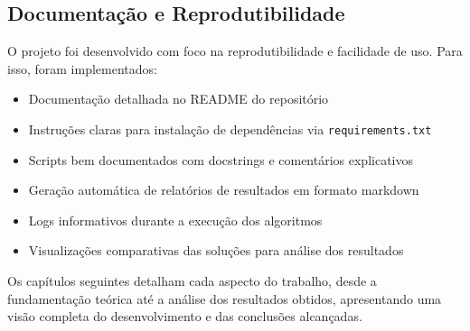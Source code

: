 \documentclass[12pt, a4paper]{report}
\begin{document}
\subsection{Documentação e Reprodutibilidade}
O projeto foi desenvolvido com foco na reprodutibilidade e facilidade de uso. Para isso, foram implementados:

\begin{itemize}
    \item Documentação detalhada no README do repositório
    \item Instruções claras para instalação de dependências via \texttt{requirements.txt}
    \item Scripts bem documentados com docstrings e comentários explicativos
    \item Geração automática de relatórios de resultados em formato markdown
    \item Logs informativos durante a execução dos algoritmos
    \item Visualizações comparativas das soluções para análise dos resultados
\end{itemize}

Os capítulos seguintes detalham cada aspecto do trabalho, desde a fundamentação teórica até a análise dos resultados obtidos, apresentando uma visão completa do desenvolvimento e das conclusões alcançadas.

\newpage
\renewcommand{\refname}{Referências Bibliográficas}

\nocite{*}
\end{document}
